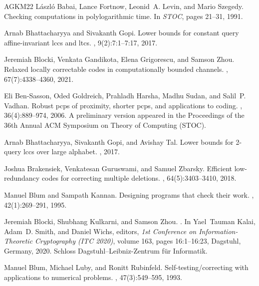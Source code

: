 \documentclass[10pt,a4paper]{article}
\theoremstyle{remark}
\begin{document}
\begin{thebibliography}{AGKM22}
L{\'{a}}szl{\'{o}} Babai, Lance Fortnow, Leonid~A. Levin, and Mario Szegedy.
\newblock Checking computations in polylogarithmic time.
\newblock In {\em {STOC}}, pages 21--31, 1991.

Arnab Bhattacharyya and Sivakanth Gopi.
\newblock Lower bounds for constant query affine-invariant lccs and ltcs.
, 9(2):7:1--7:17, 2017.

Jeremiah Blocki, Venkata Gandikota, Elena Grigorescu, and Samson Zhou.
\newblock Relaxed locally correctable codes in computationally bounded
  channels.
, 67(7):4338--4360,
  2021.

Eli Ben{-}Sasson, Oded Goldreich, Prahladh Harsha, Madhu Sudan, and Salil~P.
  Vadhan.
\newblock Robust pcps of proximity, shorter pcps, and applications to coding.
, 36(4):889--974, 2006.
\newblock A preliminary version appeared in the Proceedings of the 36th Annual
  {ACM} Symposium on Theory of Computing (STOC).

Arnab Bhattacharyya, Sivakanth Gopi, and Avishay Tal.
\newblock Lower bounds for 2-query lccs over large alphabet.
, 2017.

Joshua Brakensiek, Venkatesan Guruswami, and Samuel Zbarsky.
\newblock Efficient low-redundancy codes for correcting multiple deletions.
, 64(5):3403--3410, 2018.

Manuel Blum and Sampath Kannan.
\newblock Designing programs that check their work.
, 42(1):269--291, 1995.

Jeremiah Blocki, Shubhang Kulkarni, and Samson Zhou.
.
\newblock In Yael~Tauman Kalai, Adam~D. Smith, and Daniel Wichs, editors, {\em
  1st Conference on Information-Theoretic Cryptography (ITC 2020)}, volume 163,
  pages 16:1--16:23, Dagstuhl, Germany, 2020. Schloss Dagstuhl--Leibniz-Zentrum
  f{\"u}r Informatik.

Manuel Blum, Michael Luby, and Ronitt Rubinfeld.
\newblock Self-testing/correcting with applications to numerical problems.
, 47(3):549--595, 1993.


\end{thebibliography}
\end{document}
